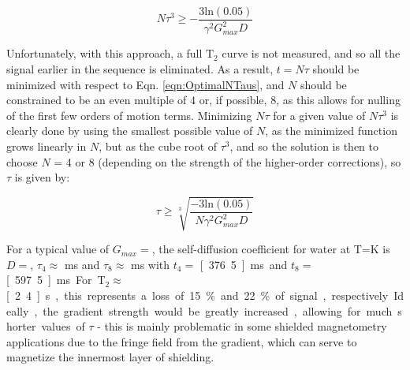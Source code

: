 \documentclass[PaulGanssle-Thesis.tex]{subfiles}
\begin{document}
\begin{equation}
\label{eqn:OptimalNTaus}
N\tau^3 \geq -\frac{3\mathrm{ln}(0.05)}{\gamma^{2}G_{max}^{2}D}
\end{equation}

Unfortunately, with this approach, a full $\mathrm{T}_{2}$ curve is not measured, and so all the signal earlier in the sequence is eliminated. As a result, $t=N\tau$ should be minimized with respect to Eqn. \ref{eqn:OptimalNTaus}, and $N$ should be constrained to be an even multiple of 4 or, if possible, 8, as this allows for nulling of the first few orders of motion terms. Minimizing $N\tau$ for a given value of $N\tau^3$ is clearly done by using the smallest possible value of $N$, as the minimized function grows linearly in $N$, but as the cube root of $\tau^3$, and so the solution is then to choose $N$ = 4 or 8 (depending on the strength of the higher-order corrections), so $\tau$ is given by:

\begin{equation}
\tau \geq \sqrt[3]{\frac{-3\mathrm{ln}(0.05)}{N\gamma^2G_{max}^{2}D}}
\end{equation}

For a typical value of $G_{max} = $, the self-diffusion coefficient for water at T=\unit[300]{K} is $D =$,\cite{Wang1965} $\tau_{4} \approx$ \unit[94]{ms} and $\tau_{8} \approx $ \unit[75]{ms} with $t_{4} =$ \unit[376.5]{ms} and $t_{8} =$ \unit[597.5]{ms}. For T$_{2} \approx$ \unit[2.4]{s}, this represents a loss of 15\% and 22\% of signal, respectively. Ideally, the gradient strength would be greatly increased, allowing for much shorter values of $\tau$ - this is mainly problematic in some shielded magnetometry applications due to the fringe field from the gradient, which can serve to magnetize the innermost layer of shielding.


\end{document}
